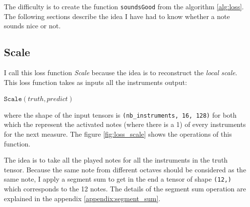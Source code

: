 \documentclass[12pt]{report}
\begin{document}
The difficulty is to create the function \texttt{soundsGood} from the algorithm \ref{alg:loss}.
The following sections describe the idea I have had to know whether a note sounds nice or not.

\subsection{Scale}
\label{sec:scale}

I call this loss function \textit{Scale} because the idea is to reconstruct the \textit{local scale}.
This loss function takes as inputs all the instruments output:
\begin{center}
$\texttt{Scale}(truth, predict)$
\end{center}
where the shape of the input tensors is \texttt{(nb\_instruments, 16, 128)} for both which the represent the activated notes (where there is a 1) of every instruments for the next measure. The figure \ref{fig:loss_scale} shows the operations of this function.

The idea is to take all the played notes for all the instruments in the truth tensor.
Because the same note from different octaves should be considered as the same note, I apply a segment sum to get in the end a tensor of shape \texttt{(12,)} which corresponds to the 12 notes.
The details of the segment sum operation are explained in the appendix \ref{appendix:segment_sum}.
\end{document}
